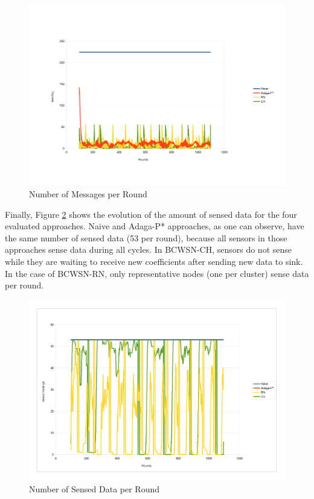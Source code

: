 \documentclass[conference]{IEEEtran}
\begin{document}
\begin{figure}[!htb]
\begin{center}
	\includegraphics[scale=0.11]{NumMsgGRAPHIC_.png}
    \caption{Number of Messages per Round}
    \label{fig:num-msg}
\end{center}
\end{figure}


Finally, Figure \ref{fig:sens-reading} shows the evolution of the amount of
sensed data for the four evaluated approaches.
Naive and Adaga-P* approaches, as one can observe, have the same number of
sensed data (53 per round), because all sensors in those approaches sense data
during all cycles. In BCWSN-CH, sensors do not sense while they are waiting to
receive new coefficients after sending new data to sink. In the case of
BCWSN-RN, only representative nodes (one per cluster) sense data per round.

\begin{figure}[!htb]
\centering
	\includegraphics[scale=0.11]{SReadGRAPHIC_.png}
    \caption{Number of Sensed Data per Round}
    \label{fig:sens-reading}
\end{figure}
\end{document}
